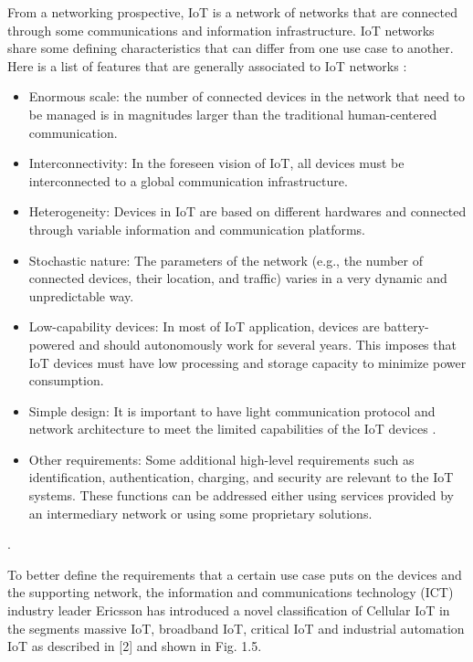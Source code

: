 \documentclass[conference]{IEEEtran}
\begin{document}
From a networking prospective, IoT is a network of networks that are connected through some communications and information infrastructure. IoT networks share some defining characteristics that can differ from one use case to another. Here is a list of features that are generally associated to IoT networks \cite{noauthor_y2060_nodate,3gpp_service_nodate_22.368}:
\begin{itemize}
    \item Enormous scale: the number of connected devices in the network that need to be managed is in magnitudes larger than the traditional human-centered communication.
    \item Interconnectivity: In the foreseen vision of IoT, all devices must be interconnected to a global communication infrastructure.
    \item Heterogeneity: Devices in IoT are based on different hardwares and connected through variable information and communication platforms.
    \item Stochastic nature: The parameters of the network (e.g., the number of connected devices, their location, and traffic) varies in a very dynamic and unpredictable way.
    \item Low-capability devices: In most of IoT application, devices are battery-powered and should autonomously work for several years. This imposes that IoT devices must have low processing and storage capacity to minimize power consumption.
    \item Simple design: It is important to have light communication protocol and network architecture to meet the limited capabilities of the IoT devices .
    \item Other requirements: Some additional high-level requirements such as identification, authentication, charging, and security are relevant to the IoT systems. These functions can be addressed either using services provided by an intermediary network or using some proprietary solutions.
\end{itemize}.





To better deﬁne the requirements that a certain use case puts on the devices and the supporting network, the information and communications technology (ICT) industry leader Ericsson has introduced a novel classiﬁcation of Cellular IoT in the segments massive IoT, broadband IoT, critical IoT and industrial automation IoT as described in [2] and shown in Fig. 1.5.
\end{document}
